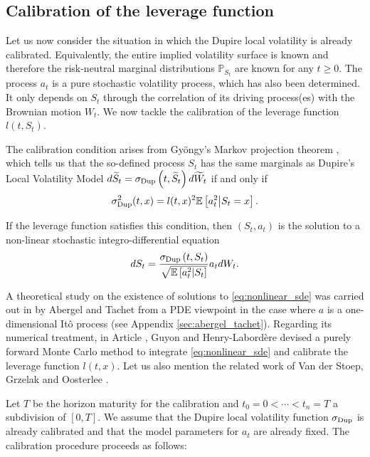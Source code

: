 \documentclass[a4paper]{article}
\newcommand{\1}{\textbf{1}}
\newcommand{\E}{\mathbb{E}}
\newcommand{\PP}{\mathbb{P}}
\begin{document}
\subsection{Calibration of the leverage function}
Let us now consider the situation in which the Dupire local volatility is already calibrated. Equivalently, the entire implied volatility surface is known and therefore the risk-neutral marginal distributions $\PP_{S_t}$ are known for any $t \geq 0$. The process $a_t$ is a pure stochastic volatility process, which has also been determined. It only depends on $S_t$ through the correlation of its driving process(es) with the Brownian motion $W_t$. We now tackle the calibration of the leverage function $l(t,S_t)$. 
\par The calibration condition arises from Gyöngy's Markov projection theorem \cite{GyongyMarkovian}, which tells us that the so-defined process $S_t$ has the same marginals as Dupire's Local Volatility Model $d\widetilde{S}_t = \sigma_{\textnormal{Dup}}\left(t,\widetilde{S}_t\right) d\widetilde{W}_t$ if and only if 
\begin{equation}\label{eq:calibration_condition}
\sigma_{\textnormal{Dup}}^2(t, x) = l(t,x)^2 \E\left[ a_t^2 \middle| S_t = x \right]. 
\end{equation}
\par If the leverage function satisfies this condition, then $(S_t, a_t)$ is the solution to a non-linear stochastic integro-differential equation
\begin{equation}\label{eq:nonlinear_sde}
dS_t = \frac{\sigma_{\textnormal{Dup}}\left(t, S_t\right)}{\sqrt{\E\left[a_t^2 \middle| S_t \right]}} a_t dW_t.
\end{equation}
\par \noindent A theoretical study on the existence of solutions to \eqref{eq:nonlinear_sde} was carried out in \cite{AbergelTachet} by Abergel and Tachet from a PDE viewpoint in the case where $a$ is a one-dimensional It\^o process (see Appendix \ref{sec:abergel_tachet}). Regarding its numerical treatment, in Article \cite{GuyonLabordereParticular}, Guyon and Henry-Labordère devised a purely forward Monte Carlo method to integrate \eqref{eq:nonlinear_sde} and calibrate the leverage function $l(t,x)$. Let us also mention the related work of Van der Stoep, Grzelak and Oosterlee \cite{StoepGrzelakOosterlee}. 
\vspace{2mm}
\par Let $T$ be the horizon maturity for the calibration and $t_0 = 0 < \cdots < t_n = T$ a subdivision of $[0, T]$. We assume that the Dupire local volatility function $\sigma_{\textnormal{Dup}}$ is already calibrated and that the model parameters for $a_t$ are already fixed. The calibration procedure proceeds as follows:
\end{document}
